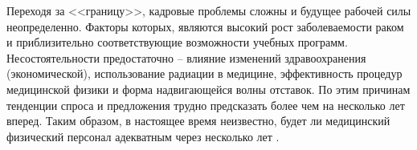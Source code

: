 Переходя за <<границу>>, кадровые проблемы сложны и будущее рабочей силы неопределенно. Факторы которых, являются высокий рост заболеваемости раком и приблизительно соответствующие возможности учебных программ. Несостоятельности предостаточно -- влияние изменений здравоохранения (экономической), использование радиации в медицине, эффективность процедур медицинской физики и форма надвигающейся волны отставок. По этим причинам тенденции спроса и предложения трудно предсказать более чем на несколько лет вперед. Таким образом, в настоящее время неизвестно, будет ли медицинский физический персонал адекватным через несколько лет \cite{Newhauser}. 
 





%











